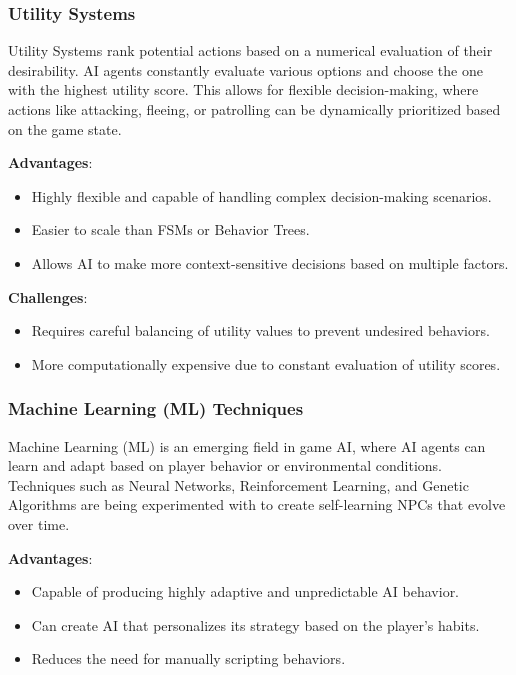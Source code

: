 \subsubsection{Utility Systems}

Utility Systems rank potential actions based on a numerical evaluation of their desirability. AI agents constantly evaluate various options and choose the one with the highest utility score. This allows for flexible decision-making, where actions like attacking, fleeing, or patrolling can be dynamically prioritized based on the game state.

\textbf{Advantages}:
\begin{itemize}
    \item Highly flexible and capable of handling complex decision-making scenarios.
    \item Easier to scale than FSMs or Behavior Trees.
    \item Allows AI to make more context-sensitive decisions based on multiple factors.
\end{itemize}

\textbf{Challenges}:
\begin{itemize}
    \item Requires careful balancing of utility values to prevent undesired behaviors.
    \item More computationally expensive due to constant evaluation of utility scores.
\end{itemize}

\subsubsection{Machine Learning (ML) Techniques}

Machine Learning (ML) is an emerging field in game AI, where AI agents can learn and adapt based on player behavior or environmental conditions. Techniques such as Neural Networks, Reinforcement Learning, and Genetic Algorithms are being experimented with to create self-learning NPCs that evolve over time.

\textbf{Advantages}:
\begin{itemize}
    \item Capable of producing highly adaptive and unpredictable AI behavior.
    \item Can create AI that personalizes its strategy based on the player's habits.
    \item Reduces the need for manually scripting behaviors.
\end{itemize}

